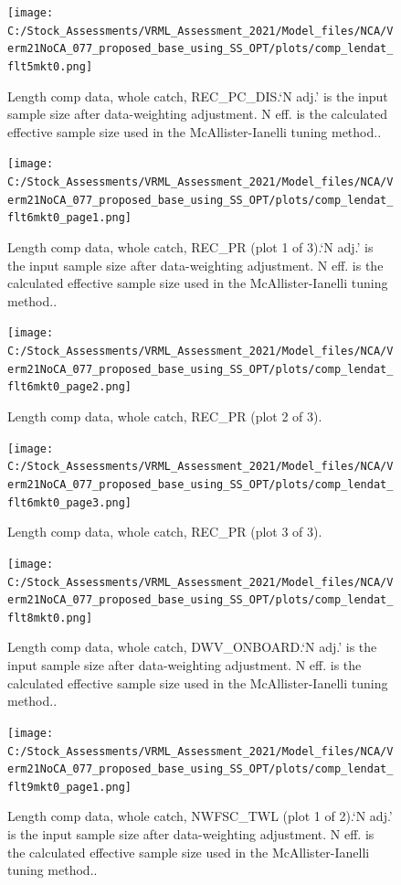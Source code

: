 \documentclass[11pt,
  english,
  a4paper,
]{article}
\begin{document}
\begin{figure}
\centering
\texttt{[image: C:/Stock\_Assessments/VRML\_Assessment\_2021/Model\_files/NCA/Verm21NoCA\_077\_proposed\_base\_using\_SS\_OPT/plots/comp\_lendat\_flt5mkt0.png]}
\caption{Length comp data, whole catch, REC\_PC\_DIS.`N adj.' is the input sample size after data-weighting adjustment. N eff. is the calculated effective sample size used in the McAllister-Ianelli tuning method..\label{fig:comp_lendat_flt5mkt0}}
\end{figure}

\begin{figure}
\centering
\texttt{[image: C:/Stock\_Assessments/VRML\_Assessment\_2021/Model\_files/NCA/Verm21NoCA\_077\_proposed\_base\_using\_SS\_OPT/plots/comp\_lendat\_flt6mkt0\_page1.png]}
\caption{Length comp data, whole catch, REC\_PR (plot 1 of 3).`N adj.' is the input sample size after data-weighting adjustment. N eff. is the calculated effective sample size used in the McAllister-Ianelli tuning method..\label{fig:comp_lendat_flt6mkt0_page1}}
\end{figure}

\begin{figure}
\centering
\texttt{[image: C:/Stock\_Assessments/VRML\_Assessment\_2021/Model\_files/NCA/Verm21NoCA\_077\_proposed\_base\_using\_SS\_OPT/plots/comp\_lendat\_flt6mkt0\_page2.png]}
\caption{Length comp data, whole catch, REC\_PR (plot 2 of 3).\label{fig:comp_lendat_flt6mkt0_page2}}
\end{figure}

\begin{figure}
\centering
\texttt{[image: C:/Stock\_Assessments/VRML\_Assessment\_2021/Model\_files/NCA/Verm21NoCA\_077\_proposed\_base\_using\_SS\_OPT/plots/comp\_lendat\_flt6mkt0\_page3.png]}
\caption{Length comp data, whole catch, REC\_PR (plot 3 of 3).\label{fig:comp_lendat_flt6mkt0_page3}}
\end{figure}

\begin{figure}
\centering
\texttt{[image: C:/Stock\_Assessments/VRML\_Assessment\_2021/Model\_files/NCA/Verm21NoCA\_077\_proposed\_base\_using\_SS\_OPT/plots/comp\_lendat\_flt8mkt0.png]}
\caption{Length comp data, whole catch, DWV\_ONBOARD.`N adj.' is the input sample size after data-weighting adjustment. N eff. is the calculated effective sample size used in the McAllister-Ianelli tuning method..\label{fig:comp_lendat_flt8mkt0}}
\end{figure}

\begin{figure}
\centering
\texttt{[image: C:/Stock\_Assessments/VRML\_Assessment\_2021/Model\_files/NCA/Verm21NoCA\_077\_proposed\_base\_using\_SS\_OPT/plots/comp\_lendat\_flt9mkt0\_page1.png]}
\caption{Length comp data, whole catch, NWFSC\_TWL (plot 1 of 2).`N adj.' is the input sample size after data-weighting adjustment. N eff. is the calculated effective sample size used in the McAllister-Ianelli tuning method..\label{fig:comp_lendat_flt9mkt0_page1}}
\end{figure}
\end{document}
